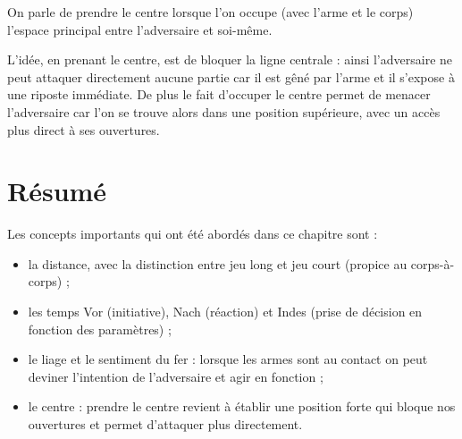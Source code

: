 \begin{definition}

On parle de prendre le centre lorsque l'on occupe (avec l'arme et le corps) l'espace principal entre l'adversaire et soi-même.
\end{definition}


L'idée, en prenant le centre, est de bloquer la ligne centrale : ainsi l'adversaire ne peut attaquer directement aucune partie car il est gêné par l'arme et il s'expose à une riposte immédiate.
De plus le fait d'occuper le centre permet de menacer l'adversaire car l'on se trouve alors dans une position supérieure, avec un accès plus direct à ses ouvertures.


\section{Résumé}


\noindent
Les concepts importants qui ont été abordés dans ce chapitre sont :
\begin{itemize}
	\item la distance, avec la distinction entre jeu long et jeu court (propice au corps-à-corps) ;
	
	\item les temps Vor (initiative), Nach (réaction) et Indes (prise de décision en fonction des paramètres) ;
	
	\item le liage et le sentiment du fer : lorsque les armes sont au contact on peut deviner l'intention de l'adversaire et agir en fonction ;
	
	\item le centre : prendre le centre revient à établir une position forte qui bloque nos ouvertures et permet d'attaquer plus directement.
\end{itemize}

